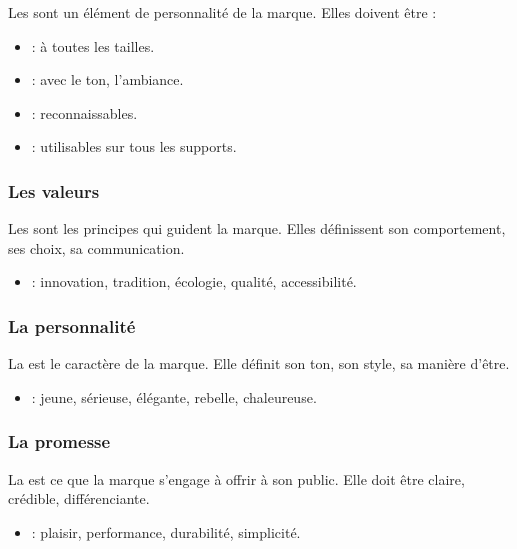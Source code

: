 Les  sont un élément de personnalité de la marque. Elles doivent être :

\begin{itemize}
    \item {} : à toutes les tailles.
    \item {} : avec le ton, l'ambiance.
    \item {} : reconnaissables.
    \item {} : utilisables sur tous les supports.
\end{itemize}

\subsubsection{Les valeurs}

Les  sont les principes qui guident la marque. Elles définissent son comportement, ses choix, sa communication.

\begin{itemize}
    \item {} : innovation, tradition, écologie, qualité, accessibilité.
\end{itemize}

\subsubsection{La personnalité}

La  est le caractère de la marque. Elle définit son ton, son style, sa manière d'être.

\begin{itemize}
    \item {} : jeune, sérieuse, élégante, rebelle, chaleureuse.
\end{itemize}

\subsubsection{La promesse}

La  est ce que la marque s'engage à offrir à son public. Elle doit être claire, crédible, différenciante.

\begin{itemize}
    \item {} : plaisir, performance, durabilité, simplicité.
\end{itemize}

